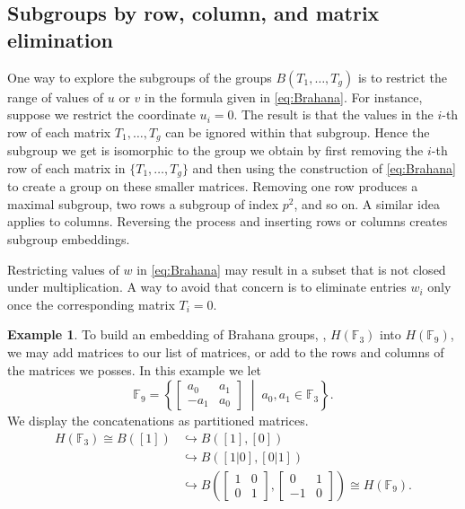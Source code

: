 \documentclass{toc}
\numberwithin{equation}{section}
\theoremstyle{plain}       %
\theoremstyle{remark}
\theoremstyle{definition}
\newtheorem{ex}[equation]{Example}  %
\numberwithin{figure}{section}
\numberwithin{table}{section}
\newcommand{\bbF}{\mathbb{F}}  %
\begin{document}
\subsection{Subgroups by row, column, and matrix elimination}
One way to explore the subgroups of the groups $B(T_1,\dots,T_g)$ is to restrict
the range of values of $u$ or $v$ in the formula given in \eqref{eq:Brahana}.
For instance, suppose we restrict the coordinate $u_i=0$.  The result is that
the values in the $i$-th row of each matrix $T_1, \dots, T_g$ can be ignored
within that subgroup.  Hence the subgroup we get is isomorphic to the group we
obtain by first removing the $i$-th row of each matrix in $\{T_1,\dots,T_g\}$
and then using the construction of \eqref{eq:Brahana} to create a group on these
smaller matrices.  Removing one row produces a maximal subgroup, two rows a
subgroup of index $p^2$, and so on.  A similar idea applies to columns.
Reversing the process and inserting rows or columns creates subgroup embeddings.

Restricting values of $w$ in \eqref{eq:Brahana} may result in a subset that is
not closed under multiplication.  A way to avoid that concern is to eliminate
entries $w_i$ only once the corresponding matrix $T_i=0$.  

\begin{ex}
To build an embedding of Brahana groups, \eg, $H(\bbF_3)$ into $H(\bbF_{9})$, we
may add matrices to our list of matrices, or  add to the rows and columns of the
matrices we posses.  In this example we let
\[
  \bbF_9=\left\{ \begin{bmatrix} a_0
      & a_1\\ -a_1 & a_0\end{bmatrix}\;\middle|\; a_0,a_1\in \bbF_3\right\}.
\]
We display the concatenations as partitioned matrices.
\begin{align*}
	H(\bbF_3)  \cong B([1]) & \hookrightarrow B([1],[0]) \\
		& \hookrightarrow B([1 | 0],[0 | 1]) \\
		& \hookrightarrow B\left(
			\begin{bmatrix}
			 1 & 0 \\
			 \hline 
			0 & 1 
			\end{bmatrix},
			\begin{bmatrix} 
			0 & 1 \\ 
			\hline 
			-1 & 0 
			\end{bmatrix}\right)
			\cong H(\bbF_{9}).
\end{align*}
\end{ex}
\end{document}

